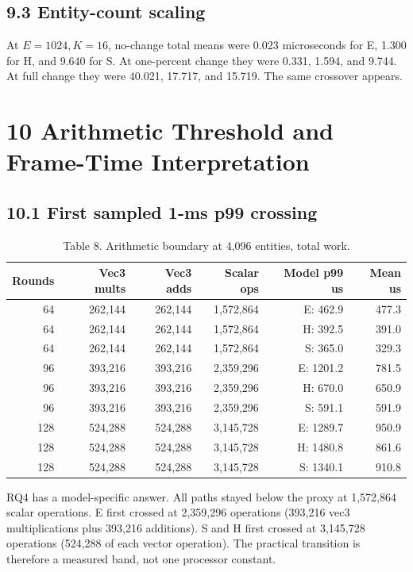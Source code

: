 \subsection{9.3 Entity-count scaling}

At \(E=1024,K=16\), no-change total means were 0.023 microseconds for E, 1.300 for H, and 9.640 for S. At one-percent change they were 0.331, 1.594, and 9.744. At full change they were 40.021, 17.717, and 15.719. The same crossover appears.

\section{10 Arithmetic Threshold and Frame-Time Interpretation}

\subsection{10.1 First sampled 1-ms p99 crossing}

\begin{table}
\caption{Table 8. Arithmetic boundary at 4,096 entities, total work.}
\begin{tabular}{rrrrrr}
Rounds & Vec3 mults & Vec3 adds & Scalar ops & Model p99 us & Mean us \\
\hline
64 & 262,144 & 262,144 & 1,572,864 & E: 462.9 & 477.3 \\
64 & 262,144 & 262,144 & 1,572,864 & H: 392.5 & 391.0 \\
64 & 262,144 & 262,144 & 1,572,864 & S: 365.0 & 329.3 \\
96 & 393,216 & 393,216 & 2,359,296 & E: 1201.2 & 781.5 \\
96 & 393,216 & 393,216 & 2,359,296 & H: 670.0 & 650.9 \\
96 & 393,216 & 393,216 & 2,359,296 & S: 591.1 & 591.9 \\
128 & 524,288 & 524,288 & 3,145,728 & E: 1289.7 & 950.9 \\
128 & 524,288 & 524,288 & 3,145,728 & H: 1480.8 & 861.6 \\
128 & 524,288 & 524,288 & 3,145,728 & S: 1340.1 & 910.8 \\
\end{tabular}
\end{table}

RQ4 has a model-specific answer. All paths stayed below the proxy at 1,572,864 scalar operations. E first crossed at 2,359,296 operations (393,216 vec3 multiplications plus 393,216 additions). S and H first crossed at 3,145,728 operations (524,288 of each vector operation). The practical transition is therefore a measured band, not one processor constant.

